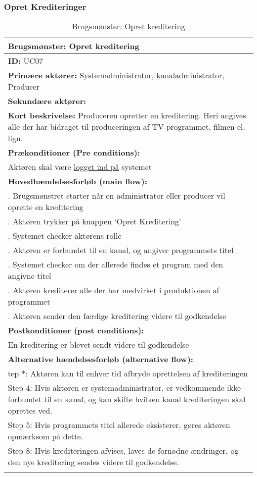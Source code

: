  \subsubsection{Opret Krediteringer}
\begin{longtable}[h] {|>{\RaggedRight}p{16cm}|}
 \hline
       \textbf{Brugsmønster:} Opret kreditering \\
    \hline
	\textbf{ID:} UC07 \\ \hline
	\textbf{Primære aktører:} Systemadministrator, kanaladministrator, Producer \\ \hline
	\textbf{Sekundære aktører:} \\ \hline
 	\textbf{Kort beskrivelse:} Produceren opretter en kreditering. Heri angives alle der har bidraget til produceringen af TV-programmet, filmen el. lign. \\ \hline
	\textbf{Prækonditioner (Pre conditions):} \\
 Aktøren skal være \hyperref[table:login]{logget ind på} systemet \\ \hline
 \textbf{Hovedhændelsesforløb (main flow):} \\
	1. Brugsmønstret starter når en administrator eller producer vil oprette en kreditering \\
	2. Aktøren trykker på knappen ‘Opret Kreditering’ \\
	3. Systemet checker aktørens rolle \\
	4. Aktøren er forbundet til en kanal, og angiver programmets titel \\
	5. Systemet checker om der allerede findes et program med den angivne titel \\ 
	6. Aktøren krediterer alle der har medvirket i produktionen af programmet \\ 
	7. Aktøren sender den færdige kreditering videre til godkendelse \\ \hline
\textbf{Postkonditioner (post conditions):} \\ 
	En kreditering er blevet sendt videre til godkendelse \\ \hline
	\textbf{Alternative hændelsesforløb (alternative flow):} \\
tep *: Aktøren kan til enhver tid afbryde oprettelsen af krediteringen \\
Step 4: Hvis aktøren er systemadministrator, er vedkommende ikke forbundet til en kanal, og kan skifte hvilken kanal krediteringen skal oprettes ved. \\

Step 5: Hvis programmets titel allerede eksisterer, gøres aktøren opmærksom på dette. \\

Step 8: Hvis krediteringen afvises, laves de fornødne ændringer, og den nye kreditering sendes videre til godkendelse. \\
\hline
\caption{Brugsmønster: Opret kreditering}
\label{tab:create_credits}
\end{longtable}


